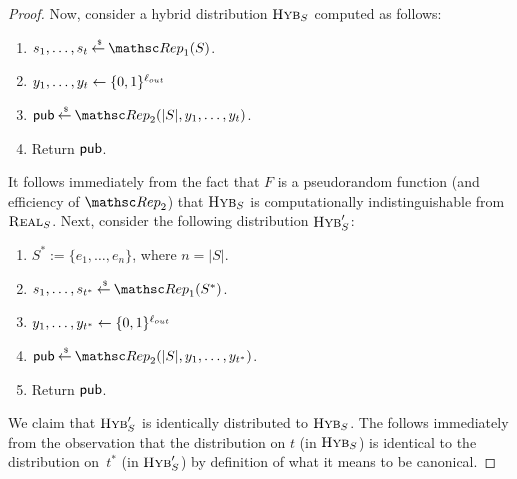 \begin{theorem}
\begin{proof}
Now, consider a hybrid distribution $\mbox{{\sc Hyb}}_S$ computed as follows:
\begin{enumerate}
\item $s_1, \ldots, s_t \getsr \Rep_1(S)$.
\item $y_1, \ldots, y_t \leftarrow \{0,1\}^{\ell_{out}}$
\item $\pubaux \getsr \Rep_2(|S|, y_1, \ldots, y_t)$.
\item Return ${\sf pub}$.
\end{enumerate}
It follows immediately from the fact that $F$ is a pseudorandom function (and efficiency
of $\Rep_2$) that $\mbox{{\sc Hyb}}_S$ is computationally indistinguishable from $\mbox{{\sc Real}}_S$.
Next, consider the following distribution $\mbox{{\sc Hyb}}'_S$:
\begin{enumerate}
\item $S^* := \{e_1, \ldots, e_n\}$, where $n = |S|$.
\item $s_1, \ldots, s_{t^*} \getsr \Rep_1(S^*)$.
\item $y_1, \ldots, y_{t^*} \leftarrow \{0,1\}^{\ell_{out}}$
\item $\pubaux \getsr \Rep_2(|S|, y_1, \ldots, y_{t^*})$.
\item Return ${\sf pub}$.
\end{enumerate}
We claim that $\mbox{{\sc Hyb}}'_S$ is identically distributed to $\mbox{{\sc Hyb}}_S$. The follows immediately from the
observation that the distribution on $t$ (in $\mbox{{\sc Hyb}}_S$) is identical to the distribution on~$t^*$
(in $\mbox{{\sc Hyb}}'_S$) by definition
of what it means to be canonical.


\end{proof}
\end{theorem}
